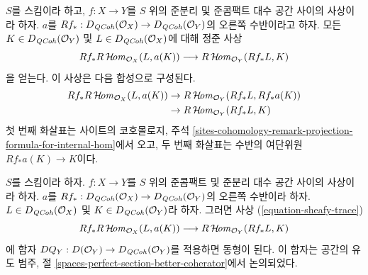 \noindent
$S$를 스킴이라 하고,
$f : X \to Y$를 $S$ 위의 준분리 및 준콤팩트 대수 공간 사이의 사상이라 하자.
$a$를
$Rf_* : D_{\mathit{QCoh}}(\mathcal{O}_X) \to D_{\mathit{QCoh}}(\mathcal{O}_Y)$의 오른쪽
수반이라고 하자. 모든
$K \in D_{\mathit{QCoh}}(\mathcal{O}_Y)$ 및
$L \in D_{\mathit{QCoh}}(\mathcal{O}_X)$에 대해 정준 사상
\begin{equation}
\label{equation-sheafy-trace}
Rf_*R\mathop{\mathcal{H}\!\mathit{om}}\nolimits_{\mathcal{O}_X}(L, a(K))
\longrightarrow
R\mathop{\mathcal{H}\!\mathit{om}}\nolimits_{\mathcal{O}_Y}(Rf_*L, K)
\end{equation}
을 얻는다. 이 사상은 다음 합성으로 구성된다.
$$
\begin{aligned}
Rf_*R\mathop{\mathcal{H}\!\mathit{om}}\nolimits_{\mathcal{O}_X}(L, a(K))
&\to R\mathop{\mathcal{H}\!\mathit{om}}\nolimits_{\mathcal{O}_Y}(Rf_*L, Rf_*a(K)) \\
&\to R\mathop{\mathcal{H}\!\mathit{om}}\nolimits_{\mathcal{O}_Y}(Rf_*L, K)
\end{aligned}
$$
첫 번째 화살표는 사이트의 코호몰로지, 주석
\ref{sites-cohomology-remark-projection-formula-for-internal-hom}에서 오고,
두 번째 화살표는 수반의 여단위원
$Rf_*a(K) \to K$이다.

\begin{lemma}
\label{lemma-iso-on-RSheafHom}
$S$를 스킴이라 하자.
$f : X \to Y$를 $S$ 위의 준콤팩트 및 준분리 대수 공간 사이의 사상이라 하자.
$a$를
$Rf_* : D_{\mathit{QCoh}}(\mathcal{O}_X) \to D_{\mathit{QCoh}}(\mathcal{O}_Y)$의 오른쪽 수반이라 하자.
$L \in D_{\mathit{QCoh}}(\mathcal{O}_X)$ 및
$K \in D_{\mathit{QCoh}}(\mathcal{O}_Y)$라 하자.
그러면 사상 (\ref{equation-sheafy-trace})
$$
Rf_*R\mathop{\mathcal{H}\!\mathit{om}}\nolimits_{\mathcal{O}_X}(L, a(K))
\longrightarrow
R\mathop{\mathcal{H}\!\mathit{om}}\nolimits_{\mathcal{O}_Y}(Rf_*L, K)
$$
에 함자
$DQ_Y : D(\mathcal{O}_Y) \to D_{\mathit{QCoh}}(\mathcal{O}_Y)$를 적용하면
동형이 된다. 이 함자는 공간의 유도 범주, 절
\ref{spaces-perfect-section-better-coherator}에서 논의되었다.
\end{lemma}

